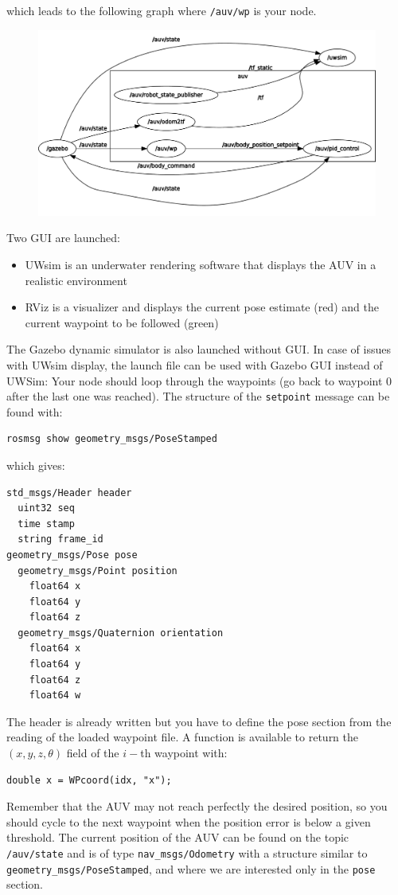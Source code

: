\documentclass{ecnreport}
\begin{document}
which leads to the following graph where \texttt{/auv/wp} is your node.
\begin{figure}[h]\centering
 \includegraphics[width=.8\linewidth]{graph_wp}
\end{figure}
Two GUI are launched: 
\begin{itemize}
 \item UWsim is an underwater rendering software that displays the AUV in a realistic environment
 \item RViz is a visualizer and displays the current pose estimate (red) and the current waypoint to be followed (green)
\end{itemize}
The Gazebo dynamic simulator is also launched without GUI. In case of issues with UWsim display, the launch file can be used with Gazebo GUI instead of UWSim: 
Your node should loop through the waypoints (go back to waypoint 0 after the last one was reached).
The structure of the \texttt{setpoint} message can be found with:
\begin{center}
\begin{lstlisting}
rosmsg show geometry_msgs/PoseStamped
\end{lstlisting}
\end{center}
which gives:
\begin{center}
\begin{lstlisting}
std_msgs/Header header
  uint32 seq
  time stamp
  string frame_id
geometry_msgs/Pose pose
  geometry_msgs/Point position
    float64 x
    float64 y
    float64 z
  geometry_msgs/Quaternion orientation
    float64 x
    float64 y
    float64 z
    float64 w
\end{lstlisting}
\end{center}
The header is already written but you have to define the pose section from the reading of the loaded waypoint file.
A function is available to return the $(x,y,z,\theta)$ field of the $i-$th waypoint with:
\begin{center}\cppstyle
\begin{lstlisting}
double x = WPcoord(idx, "x");
\end{lstlisting}
\end{center}
Remember that the AUV may not reach perfectly the desired position, so you should cycle to the next waypoint when the position error is below a given threshold.
The current position of the AUV can be found on the topic \texttt{/auv/state} and is of type \texttt{nav\_msgs/Odometry} with a structure similar to \texttt{geometry\_msgs/PoseStamped}, and where we are interested only
in the \texttt{pose} section.
\end{document}

